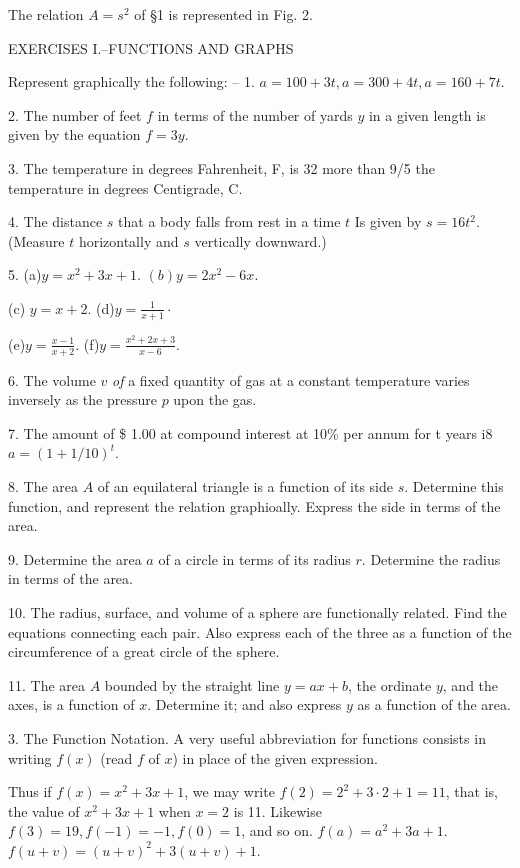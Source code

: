 \documentclass[12pt]{article}
\begin{document}
The relation $A=s^{2}$ of \S 1 is represented in Fig. 2.

EXERCISES I.--FUNCTIONS AND GRAPHS

Represent graphically the following: --
1. $a=100+3t, a=300+4t, a=160+7t$.

2. The number of feet $f$ in terms of the
number of yards $y$ in a given length is given
by the equation $f=3y$.

3. The temperature in degrees Fahrenheit, F, is 32 more than 9/5 the
temperature in degrees Centigrade, C.

4. The distance $s$ that a body falls from rest in a time $t$ Is given by
$s=16t^{2}$. (Measure $t$ horizontally and $s$ vertically downward.)

5. (a)$y=x^{2}+3x+1$. $(b)y=2x^{2}-6x$.

(c) $y=x+2$. (d)$y=\frac{1}{x+1}\cdot$

(e)$y=\frac{x-1}{x+2}$. (f)$y=\frac{x^{2}+2x+3}{x-6}$.

6. The volume $v$ {\it of} a fixed quantity of gas at a constant temperature
varies inversely as the pressure $p$ upon the gas.

7. The amount of \$ 1.00 at compound interest at 10\% per annum for
t years i8 $a=(1+1/10)^t$.

8. The area $A$ of an equilateral triangle is a function of its side $s$.
Determine this function, and represent the relation graphioally. Express
the side in terms of the area.

9. Determine the area $a$ of a circle in terms of its radius $r$. Determine 
the radius in terms of the area.

10. The radius, surface, and volume of a sphere are functionally
related. Find the equations connecting each pair. Also express each of
the three as a function of the circumference of a great circle of the sphere.

11. The area $A$ bounded by the straight line $y=ax+b$, the ordinate
$y$, and the axes, is a function of $x$. Determine it; and also express $y$ as
a function of the area.

3. The Function Notation.
A very useful abbreviation for
functions consists in writing $f(x)$ (read $f$ of $x$) in place of the
given expression.

Thus if $f(x)=x^2+3x+1$, we may write $f(2)=2^{2}+3\cdot 2+1=11$, that is, 
the value of $x^2+3x+1$ when $x=2$ is 11.
Likewise $f(3)=19,f(-1)=-1, f(0)=1$, and so on. $f(a)= a^2+3a+1$.
$f(u+v)=(u+v)^{2}+3(u+v)+1$.
\end{document}
